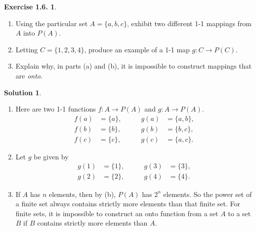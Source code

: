 \documentclass[12pt]{article}
\theoremstyle{definition}
\theoremstyle{exercise}
\newtheorem{exercise}{Exercise 1.6.}
\theoremstyle{solution}
\newtheorem*{solution}{Solution}
\begin{document}
\begin{exercise}
\label{ex:6}
    \begin{enumerate}
        \item Using the particular set \( A = \{ a, b, c \} \), exhibit two different 1-1 mappings from \( A \) into \( P(A) \).

        \item Letting \( C = \{ 1, 2, 3, 4 \} \), produce an example of a 1-1 map \( g : C \to P(C) \).

        \item Explain why, in parts (a) and (b), it is impossible to construct mappings that are \textit{onto}.
    \end{enumerate}
\end{exercise}

\begin{solution}
    \begin{enumerate}
        \item Here are two 1-1 functions \( f : A \to P(A) \) and \( g : A \to P(A) \).
        \[
            \begin{aligned}
                f(a) &= \{ a \}, \\
                f(b) &= \{ b \}, \\
                f(c) &= \{ c \},
            \end{aligned}
            \qquad
            \begin{aligned}
                g(a) &= \{ a, b \}, \\
                g(b) &= \{ b, c \}, \\
                g(c) &= \{ a, c \}.
            \end{aligned}
        \]

        \item Let \( g \) be given by
        \[
            \begin{aligned}
                g(1) &= \{ 1 \}, \\
                g(2) &= \{ 2 \},
            \end{aligned}
            \qquad
            \begin{aligned}
                g(3) &= \{ 3 \}, \\
                g(4) &= \{ 4 \}.
            \end{aligned}
        \]

        \item If \( A \) has \( n \) elements, then by  (b), \( P(A) \) has \( 2^n \) elements. So the power set of a finite set always contains strictly more elements than that finite set. For finite sets, it is impossible to construct an onto function from a set \( A \) to a set \( B \) if \( B \) contains strictly more elements than \( A \).
    \end{enumerate}
\end{solution}
\end{document}
